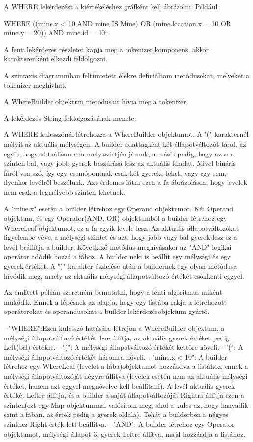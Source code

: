 A WHERE lekérdezést a kiértékeléshez gráfként kell ábrázolni. Például

\begin{sql}
WHERE ((mine.x < 10 AND mine IS Mine)
  OR (mine.location.x = 10 OR mine.y = 20)) AND mine.id = 10;
\end{sql}

A fenti lekérdezés részletet kapja meg a tokenizer komponens, akkor karakterenként elkezdi feldolgozni.

A szintaxis diagrammban feltüntetett élekre definiáltam metódusokat, melyeket a tokenizer meghívhat. 

A WhereBuilder objektum metódusait hívja meg a tokenizer.

A lekérdezés String feldolgozásának menete:

A WHERE kulcsszónál létrehozza a WhereBuilder objektumot. 
A "(" karakternél mélyít az aktuális mélységen. A builder adattagként két állapotváltozót tárol, az egyik, hogy aktuálisan a fa mely szintjén járunk, a másik pedig, hogy azon a szinten bal, vagy jobb gyerek beszúrása lesz az aktuális feladat. Mivel bináris fáról van szó, így egy csomópontnak csak két gyereke lehet, vagy egy sem, ilyenkor levélről beszélünk. Azt érdemes látni ezen a fa ábrázoláson, hogy levelek nem csak a legmélyebb szinten lehetnek.

A "mine.x" esetén a builder létrehoz egy Operand objektumot. Két Operand objektum, és egy Operator(AND, OR) objektumból a builder létrehoz egy WhereLeaf objektumot, ez a fa egyik levele lesz. Az aktuális állapotváltozókat figyelembe véve, a mélységi szintet és azt, hogy jobb vagy bal gyerek lesz ez a levél beállítja a builder. Következő metódus meghívásakor az "AND" logikai operátor adódik hozzá a fához. A builder neki is beállít egy mélységi és egy gyerek értéket. A ")" karakter észlelése után a buildernek egy olyan metódusa hívódik meg, amely az aktuális mélységi állapotváltozó értékét csökkenti eggyel.

Az említett példán szeretném bemutatni, hogy a fenti algoritmus miként működik. Ennek a lépésnek az alapja, hogy egy listába rakja a létrehozott operátorokat és operandusokat a builder lekérdezésobjektum gyártó.

- "WHERE":Ezen kulcsszó hatására létrejön a WhereBuilder objektum, a mélységi állapotváltozó értékét 1-re állítja, az aktuális gyerek értéket pedig Left(bal) értékre.
- "(": A mélységi állapotváltozó értékét kettőre növeli.
- "(": A mélységi állapotváltozó értékét háromra növeli.
- "mine.x < 10": A builder létrehoz egy WhereLeaf (levelet a fába)objektumot hozzáadva a listához, ennek a mélységi állapotváltozóját négyre állítva (levelek esetén nem az aktuális mélységi értéket, hanem azt eggyel megnövelve kell beállítani). A levél aktuális gyerek értékét Leftre állítja, és a builder a saját állapotváltozóját Rightra állítja ezen a szinten(ezt egy Map objektummal valósítom meg, ahol a kulcs az, hogy hanyadik szint a fában, az érték pedig a gyerek oldala). Tehát a builderben a négyes szinthez Right érték lett beállítva.
- "AND": A builder létrehoz egy Operator objektumot, mélységi állapot 3, gyerek Leftre állítva, majd hozzáadja a listához.


